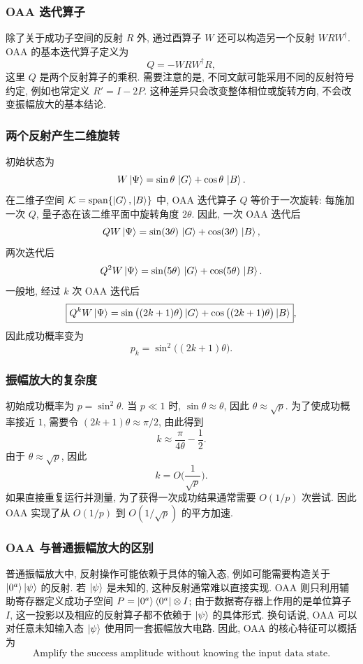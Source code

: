 \documentclass[utf8]{article} %
\numberwithin{equation}{section}   %
\begin{document}
\subsubsection{OAA 迭代算子}

除了关于成功子空间的反射 $R$ 外, 通过酉算子 $W$ 还可以构造另一个反射 $WRW^\dagger$.
OAA 的基本迭代算子定义为
\[
    Q = -WRW^\dagger R,
\]
这里 $Q$ 是两个反射算子的乘积. 需要注意的是, 不同文献可能采用不同的反射符号约定, 
例如也常定义 $R' = I - 2P$. 这种差异只会改变整体相位或旋转方向, 
不会改变振幅放大的基本结论.

\subsubsection{两个反射产生二维旋转}

初始状态为
\[
    W\ket{\Psi} = \sin\theta\,\ket{G} + \cos\theta\,\ket{B}.
\]
在二维子空间 $\mathcal{K} = \mathrm{span}\{\ket{G}, \ket{B}\}$ 中, 
OAA 迭代算子 $Q$ 等价于一次旋转: 每施加一次 $Q$, 量子态在该二维平面中旋转角度 $2\theta$.
因此, 一次 OAA 迭代后
\[
    QW\ket{\Psi} = \sin(3\theta)\,\ket{G} + \cos(3\theta)\,\ket{B},
\]
两次迭代后
\[
    Q^2W\ket{\Psi} = \sin(5\theta)\,\ket{G} + \cos(5\theta)\,\ket{B}.
\]
一般地, 经过 $k$ 次 OAA 迭代后
\[
    \boxed{Q^kW\ket{\Psi} = \sin\big((2k+1)\theta\big)\ket{G} + \cos\big((2k+1)\theta\big)\ket{B}},
\]
因此成功概率变为
\[
    \boxed{p_k = \sin^2\big((2k+1)\theta\big)}.
\]

\subsubsection{振幅放大的复杂度}

初始成功概率为 $p = \sin^2\theta$. 当 $p \ll 1$ 时, $\sin\theta \approx \theta$,
因此 $\theta \approx \sqrt{p}$. 为了使成功概率接近 $1$, 需要令
$(2k+1)\theta \approx \pi/2$, 由此得到
\[
    k \approx \frac{\pi}{4\theta} - \frac12.
\]
由于 $\theta \approx \sqrt{p}$, 因此
\[
    \boxed{k = O\Big(\frac{1}{\sqrt{p}}\Big)}.
\]
如果直接重复运行并测量, 为了获得一次成功结果通常需要 $O(1/p)$ 次尝试.
因此 OAA 实现了从 $O(1/p)$ 到 $O(1/\sqrt{p})$ 的平方加速.

\subsubsection{OAA 与普通振幅放大的区别}

普通振幅放大中, 反射操作可能依赖于具体的输入态, 例如可能需要构造关于
$\ket{0^a}\ket{\psi}$ 的反射. 若 $\ket{\psi}$ 是未知的, 这种反射通常难以直接实现.
OAA 则只利用辅助寄存器定义成功子空间 $P = \ket{0^a}\bra{0^a}\otimes I$;
由于数据寄存器上作用的是单位算子 $I$, 这一投影以及相应的反射算子都不依赖于
$\ket{\psi}$ 的具体形式. 换句话说, OAA 可以对任意未知输入态 $\ket{\psi}$
使用同一套振幅放大电路. 因此, OAA 的核心特征可以概括为
\[
    \boxed{\text{Amplify the success amplitude without knowing the input data state.}}
\]
\end{document}
